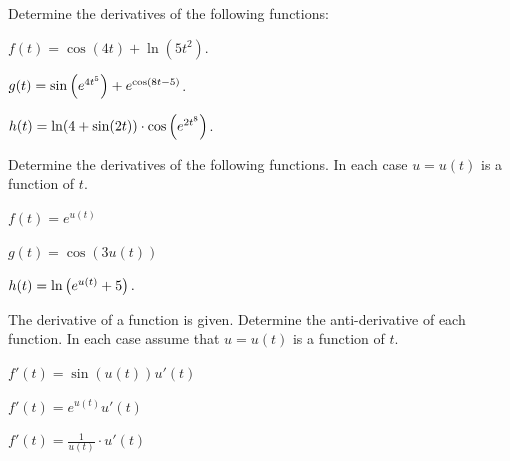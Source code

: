 
\begin{problem}
\item Determine the derivatives of the following functions:
  \begin{subproblem}
  \item $f(t) = \cos(4t) + \ln(5t^2)$.
    \vfill
  \item $g(t) = \sin\left( e^{4t^5} \right)  + e^{\cos\left( 8t-5 \right)}$.
    \vfill
  \item $h(t) = \ln(4+\sin(2t) ) \cdot \cos \left( e^{2t^8} \right)$.
    \vfill
  \end{subproblem}
\end{problem}


\begin{problem}
\item Determine the derivatives of the following functions. In each
  case $u=u(t)$ is a function of $t$.
  \begin{subproblem}
    \item $f(t) = e^{u(t)}$
      \vfill
    \item $g(t) = \cos(3 u(t)) $
      \vfill
    \item $h(t) = \ln\left( e^{u(t)} + 5 \right).$
      \vfill
  \end{subproblem}

  \clearpage

\item The derivative of a function is given. Determine the
  anti-derivative of each function. In each case assume that $u=u(t)$
  is a function of $t$.
  \begin{subproblem}
  \item $f'(t) = \sin(u(t)) u'(t)$
    \vfill
  \item $f'(t) = e^{u(t)} u'(t)$
    \vfill
  \item $f'(t) = \frac{1}{u(t)} \cdot u'(t)$
    \vfill
  \end{subproblem}
\end{problem}

